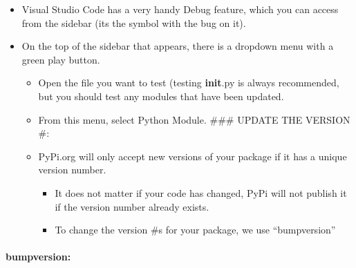 \documentclass[11pt]{article}
\providecommand{\tightlist}{%
      \setlength{\itemsep}{0pt}\setlength{\parskip}{0pt}}
\begin{document}
\begin{itemize}
\tightlist
\item
  Visual Studio Code has a very handy Debug feature, which you can
  access from the sidebar (its the symbol with the bug on it).
\item
  On the top of the sidebar that appears, there is a dropdown menu with
  a green play button.

  \begin{itemize}
  \tightlist
  \item
    Open the file you want to test (testing \textbf{init}.py is always
    recommended, but you should test any modules that have been updated.
  \item
    From this menu, select Python Module. \#\#\# UPDATE THE VERSION \#:
  \item
    PyPi.org will only accept new versions of your package if it has a
    unique version number.

    \begin{itemize}
    \tightlist
    \item
      It does not matter if your code has changed, PyPi will not publish
      it if the version number already exists.
    \item
      To change the version \#s for your package, we use ``bumpversion''
    \end{itemize}
  \end{itemize}
\end{itemize}

\hypertarget{bumpversion}{%
\paragraph{bumpversion:}\label{bumpversion}}
\end{document}

